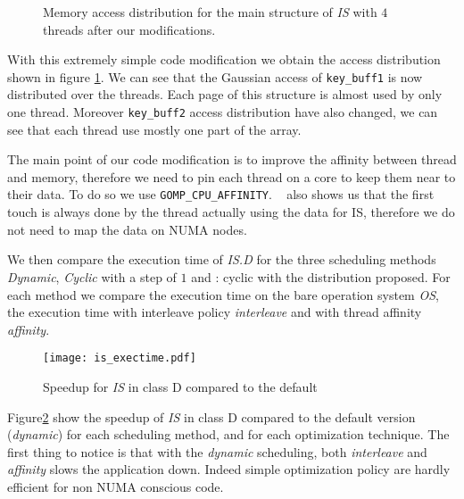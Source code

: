 \begin{figure}[htb]
    \centering


    \caption{Memory access distribution for the main structure of
        \emph{IS} with $4$ threads after our modifications.}
    \label{fig:is-behaviour-modif}
\end{figure}

With this extremely simple code modification we obtain the access distribution
shown in figure \ref{fig:is-behaviour-modif}. We can see that the Gaussian
access of \texttt{key\_buff1} is now distributed over the threads. Each page
of this structure is almost used by only one thread. Moreover
\texttt{key\_buff2} access distribution have also changed, we can see that
each thread use mostly one part of the array.

The main point of our code modification is to improve the affinity between
thread and memory, therefore we need to pin each thread on a core to keep them
near to their data. To do so we use \texttt{GOMP\_CPU\_AFFINITY}. \TABARNAC~
also shows us that the first touch is always done by the thread actually using
the data for IS, therefore we do not need to map the data on NUMA nodes.

We then compare the execution time of \emph{IS.D} for the three scheduling
methods \emph{Dynamic}, \emph{Cyclic} with a step of $1$ and \TABARNAC:
cyclic with the distribution proposed. For each method we compare the
execution time on the bare operation system \emph{OS}, the execution time with
interleave policy \emph{interleave} and with thread affinity \emph{affinity}.

\begin{figure}[htpb]
    \centering
    \texttt{[image: is\_exectime.pdf]}
    \caption{Speedup for \emph{IS} in class D compared to the default}
\label{fig:is-res}
\end{figure}

Figure\ref{fig:is-res} show the speedup of \emph{IS} in class D compared to
the default version (\emph{dynamic}) for each scheduling method, and for each
optimization technique. The first thing to notice is that with the
\emph{dynamic} scheduling, both \emph{interleave} and \emph{affinity} slows
the application down. Indeed simple optimization policy are hardly efficient
for non NUMA conscious code.

